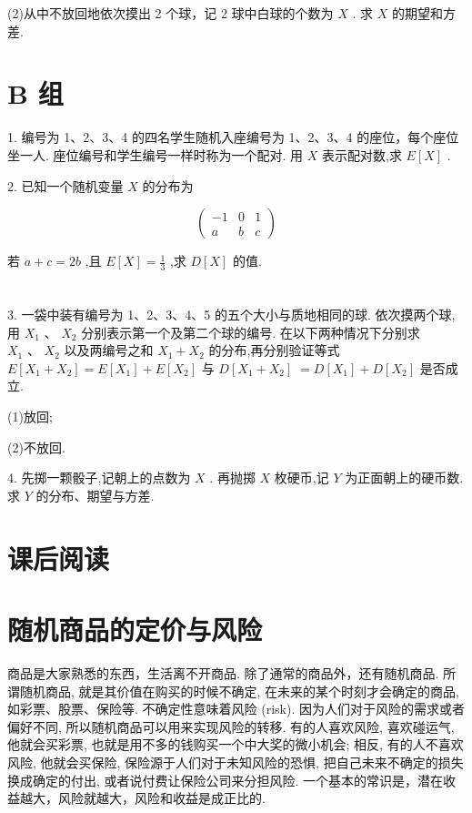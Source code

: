 \documentclass[10pt]{article}
\begin{document}
(2)从中不放回地依次摸出 2 个球，记 2 球中白球的个数为 \(X\) . 求 \(X\) 的期望和方差.

\section*{B 组}

1. 编号为 1、2、3、4 的四名学生随机入座编号为 1、2、3、4 的座位，每个座位坐一人. 座位编号和学生编号一样时称为一个配对. 用 \(X\) 表示配对数,求 \(E\left\lbrack  X\right\rbrack\) .

2. 已知一个随机变量 \(X\) 的分布为

\[
\left( \begin{matrix}  - 1 & 0 & 1 \\  a & b & c \end{matrix}\right)
\]

若 \(a + c = {2b}\) ,且 \(E\left\lbrack  X\right\rbrack   = \frac{1}{3}\) ,求 \(D\left\lbrack  X\right\rbrack\) 的值.

\section*{}

3. 一袋中装有编号为 1、2、3、4、5 的五个大小与质地相同的球. 依次摸两个球, 用 \({X}_{1}\text{ 、 }{X}_{2}\) 分别表示第一个及第二个球的编号. 在以下两种情况下分别求 \({X}_{1}\text{ 、 }{X}_{2}\) 以及两编号之和 \({X}_{1} + {X}_{2}\) 的分布,再分别验证等式 \(E\left\lbrack  {{X}_{1} + {X}_{2}}\right\rbrack   = E\left\lbrack  {X}_{1}\right\rbrack   + E\left\lbrack  {X}_{2}\right\rbrack\) 与 \(D\left\lbrack  {{X}_{1} + {X}_{2}}\right\rbrack \; = D\left\lbrack  {X}_{1}\right\rbrack   + D\left\lbrack  {X}_{2}\right\rbrack\) 是否成立.

(1)放回;

(2)不放回.

4. 先掷一颗骰子,记朝上的点数为 \(X\) . 再抛掷 \(X\) 枚硬币,记 \(Y\) 为正面朝上的硬币数. 求 \(Y\) 的分布、期望与方差.

\section*{课后阅读}

\section*{随机商品的定价与风险}

商品是大家熟悉的东西，生活离不开商品. 除了通常的商品外，还有随机商品. 所谓随机商品, 就是其价值在购买的时候不确定, 在未来的某个时刻才会确定的商品, 如彩票、股票、保险等. 不确定性意味着风险 (risk). 因为人们对于风险的需求或者偏好不同, 所以随机商品可以用来实现风险的转移. 有的人喜欢风险, 喜欢碰运气, 他就会买彩票, 也就是用不多的钱购买一个中大奖的微小机会; 相反, 有的人不喜欢风险, 他就会买保险, 保险源于人们对于未知风险的恐惧, 把自己未来不确定的损失换成确定的付出, 或者说付费让保险公司来分担风险. 一个基本的常识是，潜在收益越大，风险就越大，风险和收益是成正比的.
\end{document}
